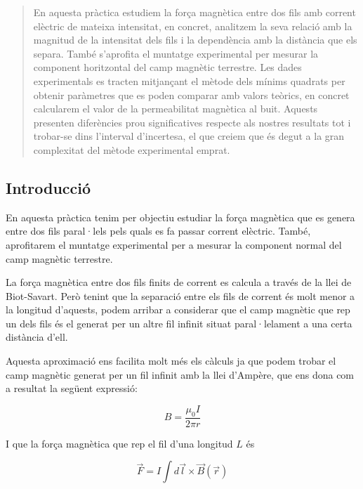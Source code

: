 \documentclass[11pt]{article}
\numberwithin{equation}{section}
\numberwithin{figure}{section}
\numberwithin{table}{section}
\begin{document}
\vspace{1em}  %

\begin{abstract}
    En aquesta pràctica estudiem la força magnètica entre dos fils amb corrent elèctric de mateixa intensitat, en concret, analitzem la seva relació amb la magnitud de la intensitat dels fils i la dependència amb la distància que els separa. També s'aprofita el muntatge experimental per mesurar la component horitzontal del camp magnètic terrestre. Les dades experimentals es tracten mitjançant el mètode dels mínims quadrats per obtenir paràmetres que es poden comparar amb valors teòrics, en concret calcularem el valor de la permeabilitat magnètica al buit. Aquests presenten diferències prou significatives respecte als nostres resultats tot i trobar-se dins l'interval d'incertesa, el que creiem que és degut a la gran complexitat del mètode experimental emprat.
\end{abstract}

\subsection{Introducció}\label{sec: PR2_intro}

En aquesta pràctica tenim per objectiu estudiar la força magnètica que es genera entre dos fils paral·lels pels quals es fa passar corrent elèctric. També, aprofitarem el muntatge experimental per a mesurar la component normal del camp magnètic terrestre.

La força magnètica entre dos fils finits de corrent es calcula a través de la llei de Biot-Savart. Però tenint que la separació entre els fils de corrent és molt menor a la longitud d'aquests, podem arribar a considerar que el camp magnètic que rep un dels fils és el generat per un altre fil infinit situat paral·lelament a una certa distància d'ell. 

Aquesta aproximació ens facilita molt més els càlculs ja que podem trobar el camp magnètic generat per un fil infinit amb la llei d'Ampère, que ens dona com a resultat la següent expressió:

\begin{equation}\label{eq_PR2: PR2_camp_fil_infinit}
    B = \frac{\mu_0I}{2\pi r}
\end{equation}

I que la força magnètica que rep el fil d'una longitud $L$ és

\begin{equation}\label{eq: PR2_Fmagn_en_funcio_B}
    \vec{F} = I\int d\vec{l}\times\vec{B}(\vec{r})
\end{equation}
\end{document}
